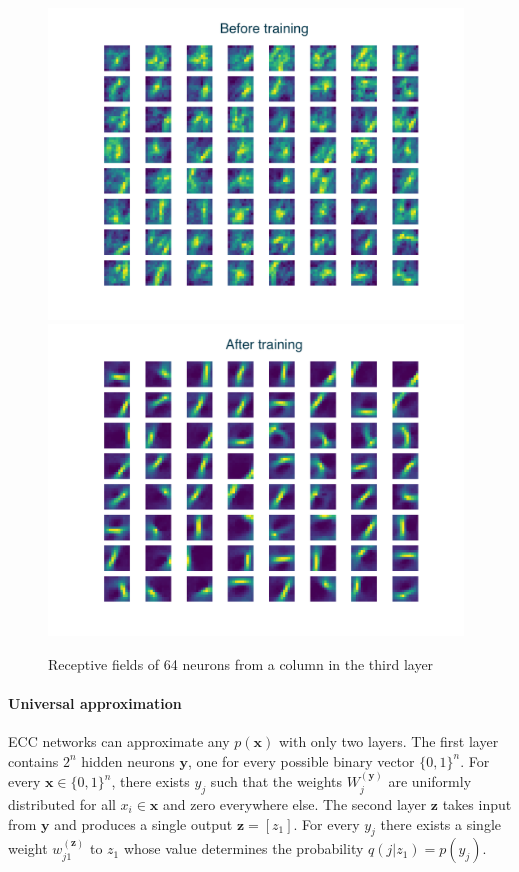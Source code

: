\documentclass[12pt]{article}
\begin{document}
\begin{figure}[!htbp]
	\centering
	\includegraphics[width=11cm]{k5s2c1d1_k2s1c20d1_k3s1c49d1_c64 machine before}
	\includegraphics[width=11cm]{k5s2c1d1_k2s1c20d1_k3s1c49d1_c64 machine after}
	\caption{Receptive fields of 64 neurons from a column in the third layer}
	\label{fig:layer3}
\end{figure} 


\paragraph{Universal approximation}

ECC networks can approximate any $p(\boldsymbol{x})$ with only two layers. The first layer contains $2^n$ hidden neurons $\boldsymbol{y}$, one for every possible binary vector $\{0,1\}^n$. For every $\boldsymbol{x} \in \{0,1\}^n$, there exists $y_j$ such that the weights $W_j^{(\boldsymbol{y})}$ are uniformly distributed for all $x_i \in \boldsymbol{x}$ and zero everywhere else. The second layer $\boldsymbol{z}$ takes input from $\boldsymbol{y}$ and produces a single output $\boldsymbol{z}=[z_1]$. For every $y_j$ there exists a single weight $w_{j1}^{(\boldsymbol{z})}$ to $z_1$ whose value determines the probability $q(j|z_1)=p(y_j)$. 
\end{document}
